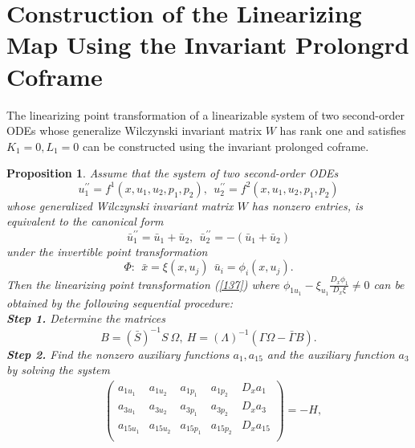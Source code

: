 \documentclass[12pt]{article}
\newtheorem{proposition}[theorem]{Proposition}
\begin{document}

\section{Construction of the Linearizing Map Using the Invariant Prolongrd Coframe}
The linearizing point transformation of a linearizable system of two second-order ODEs whose generalize Wilczynski
invariant matrix $W$ has rank one and satisfies $K_1=0,L_1=0$ can be constructed using the invariant prolonged coframe. \\
\begin{proposition}\label{s3-8}
Assume that the system of two second-order ODEs
\begin{equation}\label{136}
u_1^{\prime\prime}=f^1(x,u_1,u_2,p_1,p_2),~~u_2^{\prime\prime}=f^2(x,u_1,u_2,p_1,p_2)
\end{equation}
 whose generalized Wilczynski invariant matrix $W$ has nonzero entries, is equivalent to the canonical form
\begin{equation}\label{138}
\bar{u}_1^{\prime\prime}=\bar{u}_1+\bar{u}_2,~~\bar{u}_2^{\prime\prime}=-(\bar{u}_1+\bar{u}_2)
\end{equation}
under the invertible point transformation
\begin{equation}\label{137}
\Phi:~~\bar{x}=\xi(x,u_j)~~\bar{u}_i=\phi_{i}(x,u_j).
\end{equation}
Then the linearizing point transformation (\ref{137}) where $\phi_{1u_1}-\xi_{u_1}\frac{D_x\phi_1}{D_x\xi}\neq0$
can be obtained by the following sequential procedure:\\
\textbf{Step 1.}  Determine the matrices 
\begin{equation}\label{s3-12}
B=(\bar{S})^{-1}S~\Omega, ~H=(\Lambda)^{-1}(\Gamma\Omega-\bar{\Gamma}B).
\end{equation}
 \textbf{Step 2.} Find the nonzero auxiliary functions $a_1,a_{15}$ and the auxiliary function $a_3$ by solving the system \\
\begin{equation}\label{168}
\begin{aligned}
&\begin{pmatrix}
a_{1u_1}&a_{1u_2}&a_{1p_1}&a_{1p_2}&D_xa_1\\
a_{3u_1}&a_{3u_2}&a_{3p_1}&a_{3p_2}&D_xa_3\\
a_{15u_1}&a_{15u_2}&a_{15p_1}&a_{15p_2}&D_xa_{15}\\
\end{pmatrix}=-H,

\end{aligned}
\end{equation}
\end{proposition}
\end{document}
